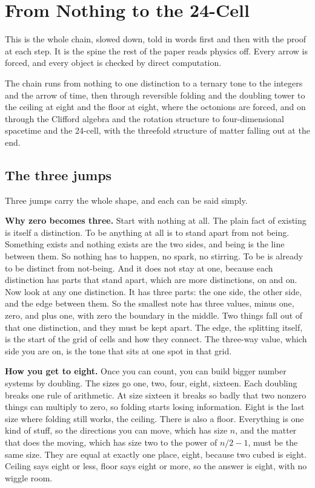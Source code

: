 \section{From Nothing to the 24-Cell}

This is the whole chain, slowed down, told in words first and then with the proof at each step. It is the spine the rest of the paper reads physics off. Every arrow is forced, and every object is checked by direct computation.

The chain runs from nothing to one distinction to a ternary tone to the integers and the arrow of time, then through reversible folding and the doubling tower to the ceiling at eight and the floor at eight, where the octonions are forced, and on through the Clifford algebra and the rotation structure to four-dimensional spacetime and the 24-cell, with the threefold structure of matter falling out at the end.

\subsection*{The three jumps}

Three jumps carry the whole shape, and each can be said simply.

\textbf{Why zero becomes three.} Start with nothing at all. The plain fact of existing is itself a distinction. To be anything at all is to stand apart from not being. Something exists and nothing exists are the two sides, and being is the line between them. So nothing has to happen, no spark, no stirring. To be is already to be distinct from not-being. And it does not stay at one, because each distinction has parts that stand apart, which are more distinctions, on and on. Now look at any one distinction. It has three parts: the one side, the other side, and the edge between them. So the smallest note has three values, minus one, zero, and plus one, with zero the boundary in the middle. Two things fall out of that one distinction, and they must be kept apart. The edge, the splitting itself, is the start of the grid of cells and how they connect. The three-way value, which side you are on, is the tone that sits at one spot in that grid.

\textbf{How you get to eight.} Once you can count, you can build bigger number systems by doubling. The sizes go one, two, four, eight, sixteen. Each doubling breaks one rule of arithmetic. At size sixteen it breaks so badly that two nonzero things can multiply to zero, so folding starts losing information. Eight is the last size where folding still works, the ceiling. There is also a floor. Everything is one kind of stuff, so the directions you can move, which has size $n$, and the matter that does the moving, which has size two to the power of $n/2 - 1$, must be the same size. They are equal at exactly one place, eight, because two cubed is eight. Ceiling says eight or less, floor says eight or more, so the answer is eight, with no wiggle room.

